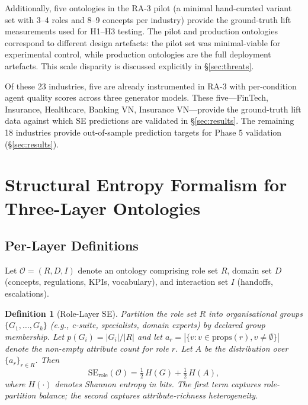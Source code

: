 \documentclass[11pt,a4paper]{article}
\newtheorem{definition}{Definition}
\newcommand{\se}{\mathrm{SE}}
\newcommand{\serole}{\se_{\text{role}}}
\newcommand{\onto}{\mathcal{O}}
\begin{document}
Additionally, five ontologies in the RA-3 pilot (a minimal hand-curated
variant set with 3--4 roles and 8--9 concepts per industry) provide the
ground-truth lift measurements used for H1--H3 testing. The pilot and
production ontologies correspond to different design artefacts: the
pilot set was minimal-viable for experimental control, while production
ontologies are the full deployment artefacts. This scale disparity is
discussed explicitly in \S\ref{sec:threats}.

Of these 23 industries, five are already instrumented in RA-3
\citep{luong2026neurosymbolic} with per-condition agent quality scores
across three generator models. These five---FinTech, Insurance,
Healthcare, Banking VN, Insurance VN---provide the ground-truth lift
data against which SE predictions are validated in \S\ref{sec:results}.
The remaining 18 industries provide out-of-sample prediction targets
for Phase 5 validation (\S\ref{sec:results}).

\section{Structural Entropy Formalism for Three-Layer Ontologies}
\label{sec:formalism}

\subsection{Per-Layer Definitions}

Let $\onto = (R, D, I)$ denote an ontology comprising role set $R$,
domain set $D$ (concepts, regulations, KPIs, vocabulary), and interaction
set $I$ (handoffs, escalations).

\begin{definition}[Role-Layer SE]
\label{def:role-se}
Partition the role set $R$ into organisational groups
$\{G_1, \ldots, G_k\}$ (e.g., c-suite, specialists, domain experts) by
declared group membership. Let $p(G_i) = |G_i| / |R|$ and let
$a_r = |\{v : v \in \text{props}(r), v \neq \emptyset\}|$ denote the
non-empty attribute count for role $r$. Let $A$ be the distribution
over $\{a_r\}_{r \in R}$. Then
$$\serole(\onto) = \tfrac{1}{2}\,H(G) + \tfrac{1}{2}\,H(A),$$
where $H(\cdot)$ denotes Shannon entropy in bits. The first term
captures role-partition balance; the second captures attribute-richness
heterogeneity.
\end{definition}
\end{document}
